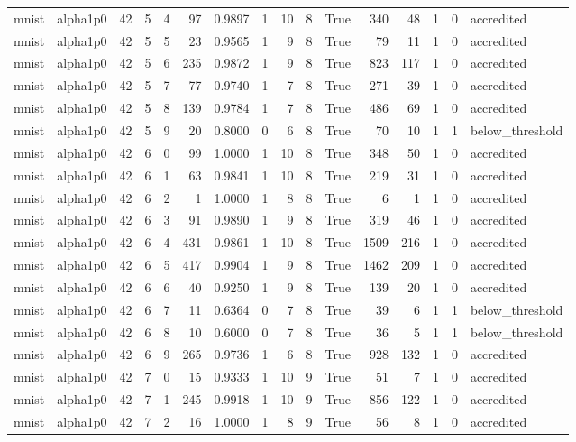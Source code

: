 \begin{tabular}{llrrrrrrrrrrrrrl}
mnist & alpha1p0 & 42 & 5 & 4 & 97 & 0.9897 & 1 & 10 & 8 & True & 340 & 48 & 1 & 0 & accredited \\
mnist & alpha1p0 & 42 & 5 & 5 & 23 & 0.9565 & 1 & 9 & 8 & True & 79 & 11 & 1 & 0 & accredited \\
mnist & alpha1p0 & 42 & 5 & 6 & 235 & 0.9872 & 1 & 9 & 8 & True & 823 & 117 & 1 & 0 & accredited \\
mnist & alpha1p0 & 42 & 5 & 7 & 77 & 0.9740 & 1 & 7 & 8 & True & 271 & 39 & 1 & 0 & accredited \\
mnist & alpha1p0 & 42 & 5 & 8 & 139 & 0.9784 & 1 & 7 & 8 & True & 486 & 69 & 1 & 0 & accredited \\
mnist & alpha1p0 & 42 & 5 & 9 & 20 & 0.8000 & 0 & 6 & 8 & True & 70 & 10 & 1 & 1 & below\_threshold \\
mnist & alpha1p0 & 42 & 6 & 0 & 99 & 1.0000 & 1 & 10 & 8 & True & 348 & 50 & 1 & 0 & accredited \\
mnist & alpha1p0 & 42 & 6 & 1 & 63 & 0.9841 & 1 & 10 & 8 & True & 219 & 31 & 1 & 0 & accredited \\
mnist & alpha1p0 & 42 & 6 & 2 & 1 & 1.0000 & 1 & 8 & 8 & True & 6 & 1 & 1 & 0 & accredited \\
mnist & alpha1p0 & 42 & 6 & 3 & 91 & 0.9890 & 1 & 9 & 8 & True & 319 & 46 & 1 & 0 & accredited \\
mnist & alpha1p0 & 42 & 6 & 4 & 431 & 0.9861 & 1 & 10 & 8 & True & 1509 & 216 & 1 & 0 & accredited \\
mnist & alpha1p0 & 42 & 6 & 5 & 417 & 0.9904 & 1 & 9 & 8 & True & 1462 & 209 & 1 & 0 & accredited \\
mnist & alpha1p0 & 42 & 6 & 6 & 40 & 0.9250 & 1 & 9 & 8 & True & 139 & 20 & 1 & 0 & accredited \\
mnist & alpha1p0 & 42 & 6 & 7 & 11 & 0.6364 & 0 & 7 & 8 & True & 39 & 6 & 1 & 1 & below\_threshold \\
mnist & alpha1p0 & 42 & 6 & 8 & 10 & 0.6000 & 0 & 7 & 8 & True & 36 & 5 & 1 & 1 & below\_threshold \\
mnist & alpha1p0 & 42 & 6 & 9 & 265 & 0.9736 & 1 & 6 & 8 & True & 928 & 132 & 1 & 0 & accredited \\
mnist & alpha1p0 & 42 & 7 & 0 & 15 & 0.9333 & 1 & 10 & 9 & True & 51 & 7 & 1 & 0 & accredited \\
mnist & alpha1p0 & 42 & 7 & 1 & 245 & 0.9918 & 1 & 10 & 9 & True & 856 & 122 & 1 & 0 & accredited \\
mnist & alpha1p0 & 42 & 7 & 2 & 16 & 1.0000 & 1 & 8 & 9 & True & 56 & 8 & 1 & 0 & accredited \\

\end{tabular}
